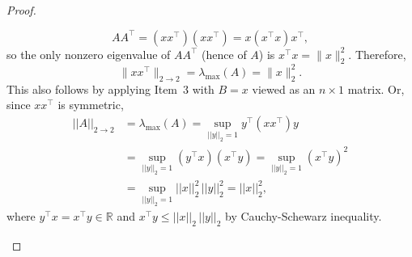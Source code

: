 \documentclass[12pt]{article}
\renewcommand{\(}{\left(}%
\renewcommand{\)}{\right)}%
\renewcommand{\[}{\left[}%
\renewcommand{\]}{\right]}%
\renewcommand{\r}{\mathbb{R}}
\newtheorem{proof}{Proof.}}
\begin{document}
\begin{proof}
\begin{itemize}
\begin{equation*}
AA^\top=(xx^\top)(xx^\top)=x(x^\top x)x^\top,
\end{equation*}
so the only nonzero eigenvalue of $AA^\top$ (hence of $A$) is $x^\top x=\|x\|_2^2$. Therefore,
\begin{equation*}
\|xx^\top\|_{2\to 2}=\lambda_{\max}(A)=\|x\|_2^2.
\end{equation*}
This also follows by applying Item~3 with $B=x$ viewed as an $n\times 1$ matrix. Or, since $xx^\top$ is symmetric,
\begin{equation*}
	\begin{split}
		||A||_{2\to 2}&=\lambda_{\max}(A)= \sup_{||y||_2=1}y^\top(xx^\top) y\\
		&=\sup_{||y||_2=1}(y^\top x)(x^\top y)=\sup_{||y||_2=1}(x^\top y)^2\\
		&=\sup_{||y||_2=1}||x||_2^2\, ||y||_2^2=||x||_2^2,
	\end{split}
\end{equation*}
where $y^\top x=x^\top y\in\r$ and $x^\top y\leq ||x||_2\,||y||_2$ by Cauchy-Schewarz inequality.
\end{itemize} 
\end{proof}
\end{document}
